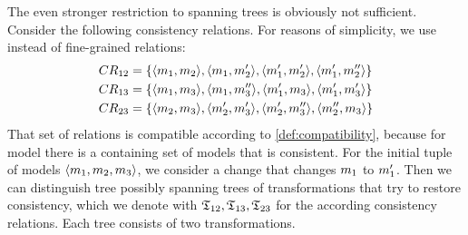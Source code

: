 The even stronger restriction to spanning trees is obviously not sufficient.
Consider the following consistency relations. For reasons of simplicity, we use \modellevelconsistencyrelations instead of fine-grained relations:
\begin{align*}
    & 
    CR_{12} = \{ \langle m_{1}, m_{2} \rangle, \langle m_{1}, m_{2}' \rangle, \langle m_{1}', m_{2}' \rangle, \langle m_{1}', m_{2}'' \rangle \} \\
    & 
    CR_{13} = \{ \langle m_{1}, m_{3} \rangle, \langle m_{1}, m_{3}'' \rangle, \langle m_{1}', m_{3} \rangle, \langle m_{1}', m_{3}' \rangle \} \\
    & 
    CR_{23} = \{ \langle m_{2}, m_{3} \rangle, \langle m_{2}', m_{3}' \rangle, \langle m_{2}', m_{3}'' \rangle, \langle m_{2}'', m_{3} \rangle \} 
\end{align*}
That set of relations is compatible according to \autoref{def:compatibility}, because for model there is a containing set of models that is consistent.
For the initial tuple of models $\langle m_{1}, m_{2}, m_{3} \rangle$, we consider a change that changes $m_{1}$ to $m_{1}'$.
Then we can distinguish tree possibly spanning trees of transformations that try to restore consistency, which we denote with $\mathfrak{T}_{12}, \mathfrak{T}_{13}, \mathfrak{T}_{23}$ for the according consistency relations.
Each tree consists of two transformations.
